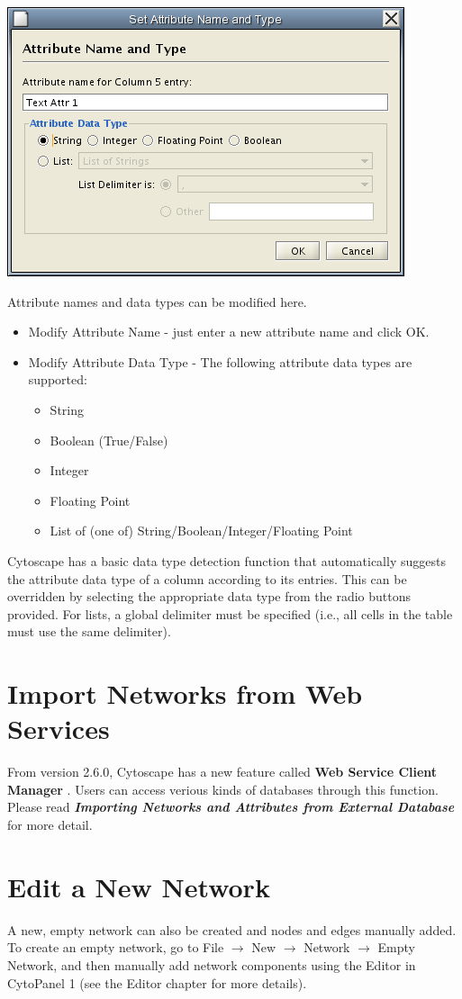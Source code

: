 \begin{center}
 \includegraphics[width=\textwidth]{images/network_table_attr_dialog1.png} 
\end{center}

 Attribute names and data types can be modified here. 
\begin{itemize}
\item Modify Attribute Name - just enter a new attribute name and click OK. 
\item Modify Attribute Data Type - The following attribute data types are supported: \begin{itemize}
\item String 
\item Boolean (True/False) 
\item Integer 
\item Floating Point 
\item List of (one of) String/Boolean/Integer/Floating Point 
\end{itemize}
\end{itemize}
 Cytoscape has a basic data type detection function that automatically suggests the attribute data type of a column according to its entries. This can be overridden by selecting the appropriate data type from the radio buttons provided. For lists, a global delimiter must be specified (i.e., all cells in the table must use the same delimiter). 

\section{Import Networks from Web Services}
 From version 2.6.0, Cytoscape has a new feature called \textbf{Web Service Client Manager}
. Users can access verious kinds of databases through this function. Please read \emph{\textbf{Importing Networks and Attributes from External Database}
}
 for more detail. 

\section{Edit a New Network}
 A new, empty network can also be created and nodes and edges manually added. To create an empty network, go to File $\rightarrow$ New $\rightarrow$ Network $\rightarrow$ Empty Network, and then manually add network components using the Editor in CytoPanel 1 (see the Editor chapter for more details). 
